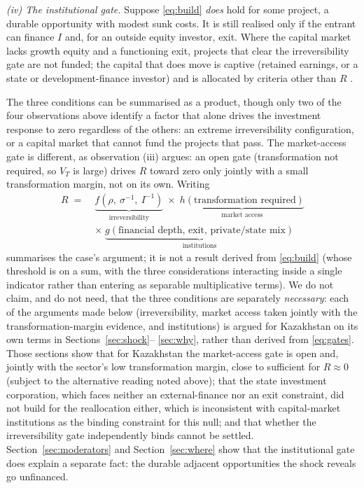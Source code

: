 \documentclass[12pt]{article}
\begin{document}
\emph{(iv) The institutional gate.} Suppose \eqref{eq:build} \emph{does} hold for some
project, a durable opportunity with modest sunk costs. It is still realised only if the
entrant can finance $I$ and, for an outside equity investor, exit. Where the capital market
lacks growth equity and a functioning exit, projects that clear the irreversibility gate are
not funded; the capital that does move is captive (retained earnings, or a state or
development-finance investor) and is allocated by criteria other than $R$
\citep{khanna1997,khannapalepu2000,rajanzingales1998}.

The three conditions can be summarised as a product, though only two of the four observations
above identify a factor that alone drives the investment response to zero regardless of the
others: an extreme irreversibility configuration, or a capital market that cannot fund the
projects that pass. The market-access gate is different, as observation (iii) argues: an open
gate (transformation not required, so $V_T$ is large) drives $R$ toward zero only jointly with
a small transformation margin, not on its own. Writing
\begin{equation}
\begin{aligned}
R \;=\;& \underbrace{f\!\left(\rho,\ \sigma^{-1},\ I^{-1}\right)}_{\text{irreversibility}}
\;\times\; \underbrace{h(\text{transformation required})}_{\text{market access}} \\[2pt]
&\times\; \underbrace{g(\text{financial depth, exit, private/state mix})}_{\text{institutions}}
\end{aligned}
\label{eq:gates}
\end{equation}
summarises the case's argument; it is not a result derived from \eqref{eq:build} (whose
threshold is on a sum, with the three considerations interacting inside a single indicator
rather than entering as separable multiplicative terms). We do not claim, and do not need,
that the three conditions are separately \emph{necessary}: each of the arguments made below (irreversibility, market access taken jointly with the transformation-margin evidence, and
institutions) is argued for Kazakhstan on its own terms in Sections~\ref{sec:shock}--%
\ref{sec:why}, rather than derived from \eqref{eq:gates}. Those sections show that for
Kazakhstan the market-access gate is open and, jointly with the sector's low transformation
margin, close to sufficient for $R \approx 0$ (subject to the alternative reading noted above);
that the state investment corporation, which faces neither an external-finance nor an exit
constraint, did not build for the reallocation either, which is inconsistent with capital-market
institutions
as the binding constraint for this null; and that whether the irreversibility gate
independently binds cannot be settled. Section~\ref{sec:moderators} and Section~\ref{sec:where}
show that the institutional gate does explain a separate fact: the durable adjacent
opportunities the shock reveals go unfinanced.
\end{document}
